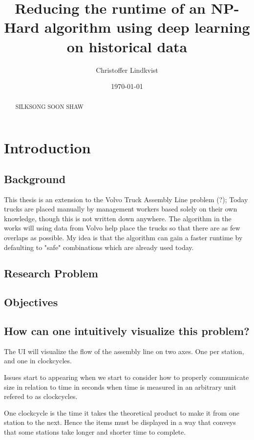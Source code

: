 \documentclass[12pt,a4paper]{report}
\begin{document}
\title{Reducing the runtime of an NP-Hard algorithm using deep learning on historical data}
\author{Christoffer Lindkvist}
\date{\today}
\maketitle

\begin{abstract}
    SILKSONG SOON SHAW 
\end{abstract}

\tableofcontents
\listoffigures

\chapter{Introduction}
\section{Background}
    This thesis is an extension to the Volvo Truck Assembly Line problem (?); 
    Today trucks are placed manually by management workers based solely on their own knowledge, 
    though this is not written down anywhere. 
    The algorithm in the works will using data from Volvo help place the trucks so that there are as few overlaps as possible. 
    My idea is that the algorithm can gain a faster runtime by defaulting to "safe" combinations which are already used today.
    
\section{Research Problem}
\section{Objectives}
\section{How can one intuitively visualize this problem?}
    The UI will visualize the flow of the assembly line on two axes. One per station, and one in clockcycles.

    Issues start to appearing when we start to consider how to properly communicate size in relation to time in seconds when time is measured in an arbitrary unit refered to as clockcycles.

    One clockcycle is the time it takes the theoretical product to make it from one station to the next. Hence the items must be displayed in a way that conveys that some stations take longer and shorter time to complete.
\end{document}
